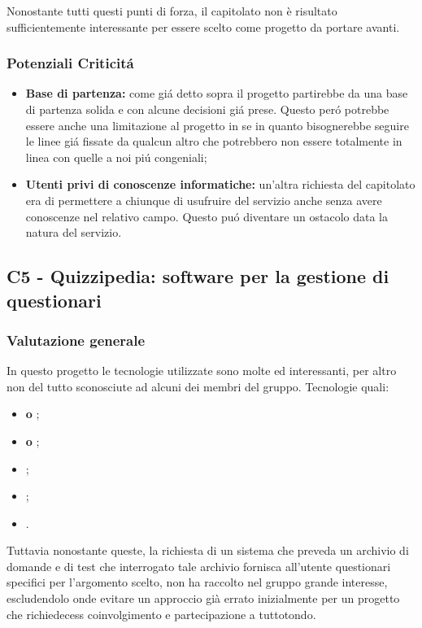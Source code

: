 Nonostante tutti questi punti di forza, il capitolato non è risultato sufficientemente interessante per essere scelto come progetto da portare avanti.

\subsubsection{Potenziali Criticit\'a}

\begin{itemize}
	\item \textbf{Base di partenza:} come gi\'a detto sopra il progetto partirebbe da una base di partenza solida e con alcune decisioni gi\'a prese. Questo per\'o potrebbe essere anche una limitazione al progetto in se in quanto bisognerebbe seguire le linee gi\'a fissate da qualcun altro che potrebbero non essere totalmente in linea con quelle a noi pi\'u congeniali;
\end{itemize}

\begin{itemize}
	\item \textbf{Utenti privi di conoscenze informatiche:} un'altra richiesta del capitolato era di permettere a chiunque di usufruire del servizio anche senza avere conoscenze nel relativo campo. Questo pu\'o diventare un ostacolo data la natura del servizio.
\end{itemize}


\subsection{C5 - Quizzipedia: software per la gestione di questionari}
\subsubsection{Valutazione generale}
In questo progetto le tecnologie utilizzate sono molte ed interessanti, per altro non del tutto sconosciute ad alcuni dei membri del gruppo.
Tecnologie quali:
 \begin{itemize}
	\item \textbf{ o };
	\item\textbf{ o };
	\item \textbf{};
	\item \textbf{};
	\item \textbf{}.
\end{itemize}
Tuttavia nonostante queste, la richiesta di un sistema che preveda un archivio di domande e di test che interrogato tale archivio fornisca all'utente questionari specifici per l'argomento scelto, non ha raccolto nel gruppo grande interesse, escludendolo onde evitare un approccio gi\`a errato inizialmente per un progetto che richiedecess coinvolgimento e partecipazione a tuttotondo.

